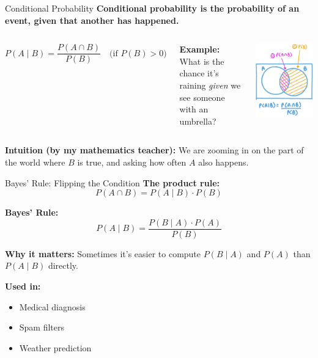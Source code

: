 \documentclass[handout,aspectratio=169]{beamer}
\begin{document}
\begin{frame}{Conditional Probability}
  \textbf{Conditional probability is the probability of an event, given that another has happened.}

  \vspace{1em}
  \begin{columns}
\[
    P(A \mid B) = \frac{P(A \cap B)}{P(B)} \quad \text{(if } P(B) > 0\text{)}
  \]

  \vspace{1em}
  \textbf{Example:} What is the chance it’s raining \textit{given} we see someone with an umbrella?
  
\includegraphics[width=0.6\linewidth]{figs/conditional.png}
    
\end{columns}
  

  \vspace{1em}
  \textbf{Intuition (by my mathematics teacher):} We are zooming in on the part of the world where $B$ is true, and asking how often $A$ also happens.
\end{frame}

\begin{frame}{Bayes' Rule: Flipping the Condition}
  \textbf{The product rule:}
  \[
    P(A \cap B) = P(A \mid B) \cdot P(B)
  \]

  \vspace{1em}
  \textbf{Bayes' Rule:}
  \[
    P(A \mid B) = \frac{P(B \mid A) \cdot P(A)}{P(B)}
  \]

  \vspace{1em}
  \textbf{Why it matters:} Sometimes it's easier to compute $P(B \mid A)$ and $P(A)$ than $P(A \mid B)$ directly.

  \vspace{1em}
  \textbf{Used in:}
  \begin{itemize}
    \item Medical diagnosis
    \item Spam filters
    \item Weather prediction
  \end{itemize}
\end{frame}
\end{document}
